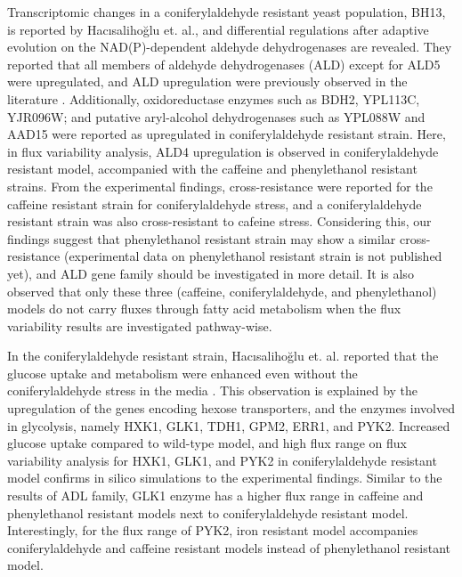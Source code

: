 Transcriptomic changes in a coniferylaldehyde resistant yeast population, BH13, is reported by Hacısalihoğlu et. al., and differential regulations after adaptive evolution on the NAD(P)-dependent aldehyde dehydrogenases are revealed. They reported that all members of aldehyde dehydrogenases (ALD) except for ALD5 were upregulated, and ALD upregulation were previously observed in the literature \cite{adeboye2015catabolism}. Additionally, oxidoreductase enzymes such as BDH2, YPL113C, YJR096W; and putative aryl-alcohol dehydrogenases such as YPL088W and AAD15 were reported as upregulated in coniferylaldehyde resistant strain. Here, in flux variability analysis, ALD4 upregulation is observed in coniferylaldehyde resistant model, accompanied with the caffeine and phenylethanol resistant strains. From the experimental findings, cross-resistance were reported for the caffeine resistant strain for coniferylaldehyde stress, and a coniferylaldehyde resistant strain was also cross-resistant to cafeine stress. Considering this, our findings suggest that phenylethanol resistant strain may show a similar cross-resistance (experimental data on phenylethanol resistant strain is not published yet), and ALD gene family should be investigated in more detail. It is also observed that only these three (caffeine, coniferylaldehyde, and phenylethanol) models do not carry fluxes through fatty acid metabolism when the flux variability results are investigated pathway-wise.

In the coniferylaldehyde resistant strain, Hacısalihoğlu et. al. reported that the glucose uptake and metabolism were enhanced even without the coniferylaldehyde stress in the media \cite{Hacsaliholu2019}. This observation is explained by the upregulation of the genes encoding hexose transporters, and the enzymes involved in glycolysis, namely HXK1, GLK1, TDH1, GPM2, ERR1, and PYK2. Increased glucose uptake compared to wild-type model, and high flux range on flux variability analysis for HXK1, GLK1, and PYK2 in coniferylaldehyde resistant model confirms in silico simulations to the experimental findings. Similar to the results of ADL family, GLK1 enzyme has a higher flux range in caffeine and phenylethanol resistant models next to coniferylaldehyde resistant model. Interestingly, for the flux range of PYK2, iron resistant model accompanies coniferylaldehyde and caffeine resistant models instead of phenylethanol resistant model.


